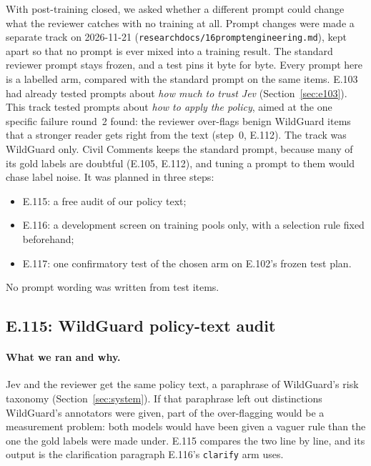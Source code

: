 \documentclass[11pt]{article}
\renewcommand{\_}{\origunderscore\allowbreak}
\begin{document}
With post-training closed, we asked whether a different prompt could change what the reviewer catches with no training at all. Prompt changes were made a separate track on 2026-11-21 (\texttt{research\_docs/16\_prompt\_engineering.md}), kept apart so that no prompt is ever mixed into a training result. The standard reviewer prompt stays frozen, and a test pins it byte for byte. Every prompt here is a labelled arm, compared with the standard prompt on the same items. E.103 had already tested prompts about \emph{how much to trust Jev} (Section~\ref{sec:e103}). This track tested prompts about \emph{how to apply the policy}, aimed at the one specific failure round~2 found: the reviewer over-flags benign WildGuard items that a stronger reader gets right from the text (step~0, E.112). The track was WildGuard only. Civil Comments keeps the standard prompt, because many of its gold labels are doubtful (E.105, E.112), and tuning a prompt to them would chase label noise. It was planned in three steps:
\begin{itemize}[leftmargin=*,itemsep=2pt]
  \item E.115: a free audit of our policy text;
  \item E.116: a development screen on training pools only, with a selection rule fixed beforehand;
  \item E.117: one confirmatory test of the chosen arm on E.102's frozen test plan.
\end{itemize}
No prompt wording was written from test items.

\subsection{E.115: WildGuard policy-text audit}\label{sec:e115}

\paragraph{What we ran and why.}
Jev and the reviewer get the same policy text, a paraphrase of WildGuard's risk taxonomy (Section~\ref{sec:system}). If that paraphrase left out distinctions WildGuard's annotators were given, part of the over-flagging would be a measurement problem: both models would have been given a vaguer rule than the one the gold labels were made under. E.115 compares the two line by line, and its output is the clarification paragraph E.116's \texttt{clarify} arm uses.
\end{document}
